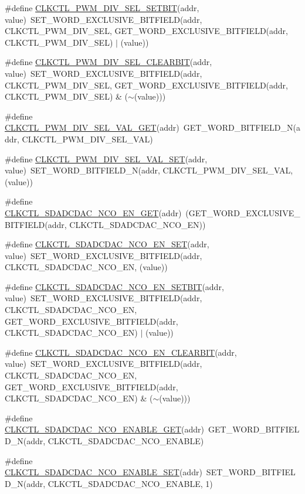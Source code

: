 \begin{DoxyCompactItemize}
\#define \hyperlink{a00544_a4a108a4ff76e1c56e17a2363273dcf79}{CLKCTL\_\-PWM\_\-DIV\_\-SEL\_\-SETBIT}(addr, value)~SET\_\-WORD\_\-EXCLUSIVE\_\-BITFIELD(addr, CLKCTL\_\-PWM\_\-DIV\_\-SEL, GET\_\-WORD\_\-EXCLUSIVE\_\-BITFIELD(addr, CLKCTL\_\-PWM\_\-DIV\_\-SEL) $|$ (value))
\item 
\#define \hyperlink{a00544_a9ad25b18fab0864a06c14234f9cf9d11}{CLKCTL\_\-PWM\_\-DIV\_\-SEL\_\-CLEARBIT}(addr, value)~SET\_\-WORD\_\-EXCLUSIVE\_\-BITFIELD(addr, CLKCTL\_\-PWM\_\-DIV\_\-SEL, GET\_\-WORD\_\-EXCLUSIVE\_\-BITFIELD(addr, CLKCTL\_\-PWM\_\-DIV\_\-SEL) \& ($\sim$(value)))
\item 
\#define \hyperlink{a00544_a14ddfe6fa44ff995535b79c0c0474e2a}{CLKCTL\_\-PWM\_\-DIV\_\-SEL\_\-VAL\_\-GET}(addr)~GET\_\-WORD\_\-BITFIELD\_\-N(addr, CLKCTL\_\-PWM\_\-DIV\_\-SEL\_\-VAL)
\item 
\#define \hyperlink{a00544_a1faa7a6cfe44924951c891044b28febb}{CLKCTL\_\-PWM\_\-DIV\_\-SEL\_\-VAL\_\-SET}(addr, value)~SET\_\-WORD\_\-BITFIELD\_\-N(addr, CLKCTL\_\-PWM\_\-DIV\_\-SEL\_\-VAL, (value))
\item 
\#define \hyperlink{a00544_add17178fb6170a96e96c2883d2c6fed7}{CLKCTL\_\-SDADCDAC\_\-NCO\_\-EN\_\-GET}(addr)~(GET\_\-WORD\_\-EXCLUSIVE\_\-BITFIELD(addr, CLKCTL\_\-SDADCDAC\_\-NCO\_\-EN))
\item 
\#define \hyperlink{a00544_af869ae1d1fd0a05c58b02d84386f420d}{CLKCTL\_\-SDADCDAC\_\-NCO\_\-EN\_\-SET}(addr, value)~SET\_\-WORD\_\-EXCLUSIVE\_\-BITFIELD(addr, CLKCTL\_\-SDADCDAC\_\-NCO\_\-EN, (value))
\item 
\#define \hyperlink{a00544_ab16174d781ecd0a58fa3e4eefe8a8b14}{CLKCTL\_\-SDADCDAC\_\-NCO\_\-EN\_\-SETBIT}(addr, value)~SET\_\-WORD\_\-EXCLUSIVE\_\-BITFIELD(addr, CLKCTL\_\-SDADCDAC\_\-NCO\_\-EN, GET\_\-WORD\_\-EXCLUSIVE\_\-BITFIELD(addr, CLKCTL\_\-SDADCDAC\_\-NCO\_\-EN) $|$ (value))
\item 
\#define \hyperlink{a00544_a578cb171d67d4bc5a52b6f3ad81d46f0}{CLKCTL\_\-SDADCDAC\_\-NCO\_\-EN\_\-CLEARBIT}(addr, value)~SET\_\-WORD\_\-EXCLUSIVE\_\-BITFIELD(addr, CLKCTL\_\-SDADCDAC\_\-NCO\_\-EN, GET\_\-WORD\_\-EXCLUSIVE\_\-BITFIELD(addr, CLKCTL\_\-SDADCDAC\_\-NCO\_\-EN) \& ($\sim$(value)))
\item 
\#define \hyperlink{a00544_a8b673def69d2fa4e6a4783080c16c233}{CLKCTL\_\-SDADCDAC\_\-NCO\_\-ENABLE\_\-GET}(addr)~GET\_\-WORD\_\-BITFIELD\_\-N(addr, CLKCTL\_\-SDADCDAC\_\-NCO\_\-ENABLE)
\item 
\#define \hyperlink{a00544_a286c2f6e8751237caf793bcc0e3817f4}{CLKCTL\_\-SDADCDAC\_\-NCO\_\-ENABLE\_\-SET}(addr)~SET\_\-WORD\_\-BITFIELD\_\-N(addr, CLKCTL\_\-SDADCDAC\_\-NCO\_\-ENABLE, 1)

\end{DoxyCompactItemize}
